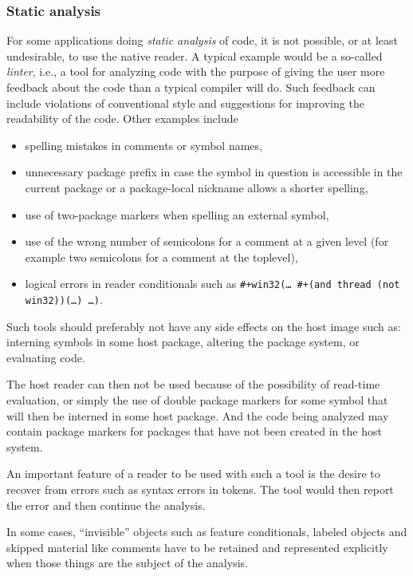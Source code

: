 \subsubsection{Static analysis}

For some applications doing \emph{static analysis} of \cl{} code, it
is not possible, or at least undesirable, to use the native reader.  A
typical example would be a so-called \emph{linter}, i.e., a tool for
analyzing code with the purpose of giving the user more feedback about
the code than a typical compiler will do.  Such feedback can include
violations of conventional style and suggestions for improving the
readability of the code.  Other examples include

\begin{itemize}
\item spelling mistakes in comments or symbol names,
\item unnecessary package prefix in case the symbol in question is
  accessible in the current package or a package-local nickname allows
  a shorter spelling,
\item use of two-package markers when spelling an external symbol,
\item use of the wrong number of semicolons for a comment at a given
  level (for example two semicolons for a comment at the toplevel),
\item logical errors in reader conditionals such as
  \texttt{\#+win32(\dots{} \#+(and thread (not win32))(\dots{}) \dots{})}.
\end{itemize}

Such tools should preferably not have any side effects on the host
\cl{} image such as: interning symbols in some host package, altering
the package system, or evaluating code.

The host reader can then not be used because of the possibility of
read-time evaluation, or simply the use of double package markers for
some symbol that will then be interned in some host package.  And the
code being analyzed may contain package markers for packages that have
not been created in the host \cl{} system.

An important feature of a reader to be used with such a tool is the
desire to recover from errors such as syntax errors in tokens.  The
tool would then report the error and then continue the analysis.

In some cases, ``invisible'' objects such as feature conditionals,
labeled objects and skipped material like comments have to be retained
and represented explicitly when those things are the subject of the
analysis.

